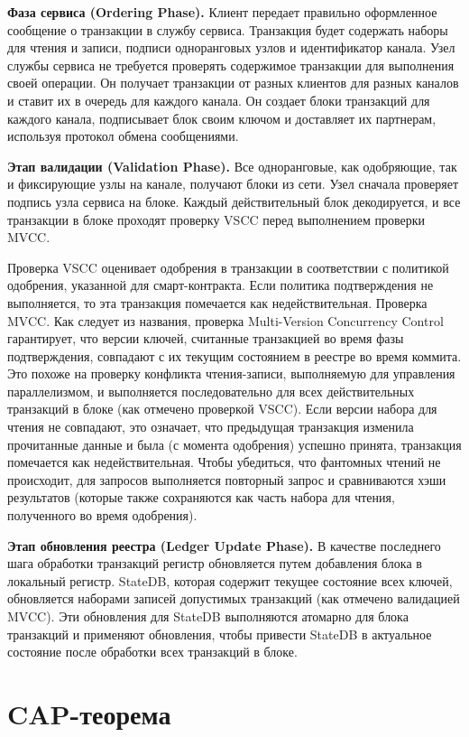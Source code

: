 \textbf{Фаза сервиса (Ordering Phase).} Клиент передает правильно оформленное сообщение о транзакции в службу сервиса. Транзакция будет содержать наборы для чтения и записи, подписи одноранговых узлов и идентификатор канала. Узел службы сервиса не требуется проверять содержимое транзакции для выполнения своей операции. Он получает транзакции от разных клиентов для разных каналов и ставит их в очередь для каждого канала. Он создает блоки транзакций для каждого канала, подписывает блок своим ключом и доставляет их партнерам, используя протокол обмена сообщениями.

\textbf{Этап валидации (Validation Phase).} Все одноранговые, как одобряющие, так и фиксирующие узлы на канале, получают блоки из сети. Узел сначала проверяет подпись узла сервиса на блоке. Каждый действительный блок декодируется, и все транзакции в блоке проходят проверку VSCC перед выполнением проверки MVCC.

Проверка	VSCC	оценивает	одобрения	в	транзакции	в		соответствии	с политикой	одобрения,		указанной	для	смарт-контракта.		Если	политика подтверждения не выполняется, то эта транзакция помечается как недействительная. Проверка MVCC. Как следует из названия, проверка Multi-Version Concurrency Control гарантирует, что версии ключей, считанные транзакцией во время фазы подтверждения, совпадают с их текущим состоянием в реестре во время коммита. Это похоже на проверку конфликта чтения-записи, выполняемую для управления параллелизмом, и выполняется последовательно для всех действительных транзакций в блоке (как отмечено проверкой VSCC). Если версии набора для чтения не совпадают, это означает, что предыдущая транзакция изменила прочитанные данные и была (с момента одобрения) успешно принята, транзакция помечается как недействительная. Чтобы убедиться, что фантомных чтений не происходит, для запросов выполняется повторный запрос и сравниваются хэши результатов (которые также сохраняются как часть набора для чтения, полученного во время одобрения).

\textbf{Этап обновления реестра (Ledger Update Phase).} В качестве последнего шага обработки транзакций регистр обновляется путем добавления блока в локальный регистр. StateDB, которая содержит текущее состояние всех ключей, обновляется наборами записей допустимых транзакций (как отмечено валидацией MVCC). Эти обновления для StateDB выполняются атомарно для блока транзакций и применяют обновления, чтобы привести StateDB в актуальное состояние после обработки всех транзакций в блоке.

\section{CAP-теорема} \label{sec:ch1/sec4}

